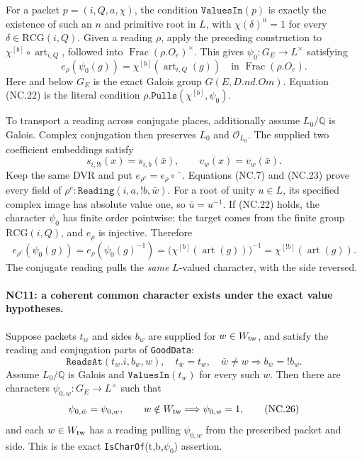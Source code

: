 For a packet \(p=(i,Q,a,\chi)\), the condition
\(\texttt{ValuesIn}(p)\) is exactly the existence of such an
\(n\) and primitive root in \(L\), with \(\chi(\delta)^n=1\)
for every \(\delta\in\mathrm{RCG}(i,Q)\).
Given a reading \(\rho\), apply the preceding construction
to
\(\chi^{[b]}\circ\operatorname{art}_{i,Q}\), followed into
\(\operatorname{Frac}(\rho.O_e)^\times\).
This gives \(\psi_0:G_E\to L^\times\) satisfying
\[
 e_\rho(\psi_0(g))
 =\chi^{[b]}(\operatorname{art}_{i,Q}(g))
 \quad\text{in }\operatorname{Frac}(\rho.O_e).
 \tag{NC.22}
\]
Here and below \(G_E\) is the exact Galois group \(G(E,D.nd.Om)\).
Equation (NC.22) is the literal condition
\(\rho.\texttt{Pulls}(\chi^{[b]},\psi_0)\).

To transport a reading across conjugate places, additionally
assume \(L_0/\mathbb Q\) is Galois. Complex conjugation then
preserves \(L_0\) and \(\mathcal O_{L_0}\).
The supplied two coefficient embeddings satisfy
\[
 s_{i,!b}(x)=s_{i,b}(\bar x),\qquad
 v_{\bar w}(x)=v_w(\bar x).
 \tag{NC.23}
\]
Keep the same DVR and put \(e_{\rho^c}=e_\rho\circ\bar{\phantom{x}}\).
Equations (NC.7) and (NC.23) prove every field of
\(\rho^c:\texttt{Reading}(i,a,!b,\bar w)\).
For a root of unity \(u\in L\), its specified complex image
has absolute value one, so \(\bar u=u^{-1}\).
If (NC.22) holds, the character \(\psi_0\) has finite order
pointwise: the target comes from the finite group
\(\mathrm{RCG}(i,Q)\), and \(e_\rho\) is injective.
Therefore
\[
 e_{\rho^c}(\psi_0(g))
 =e_\rho(\psi_0(g)^{-1})
 =\bigl(\chi^{[b]}(\operatorname{art}(g))\bigr)^{-1}
 =\chi^{[!b]}(\operatorname{art}(g)).
 \tag{NC.24}
\]
The conjugate reading pulls the \emph{same} \(L\)-valued
character, with the side reversed.

\paragraph{NC11: a coherent common character exists under the exact value hypotheses.}
Suppose packets \(t_w\) and sides \(b_w\) are supplied for
\(w\in W_{\rm tw}\), and satisfy the reading and conjugation
parts of \texttt{GoodData}:
\[
 \texttt{ReadsAt}(t_w.i,b_w,w),\quad
 t_{\bar w}=t_w,\quad
 \bar w\ne w\Longrightarrow b_{\bar w}=!b_w.
 \tag{NC.25}
\]
Assume \(L_0/\mathbb Q\) is Galois and
\(\texttt{ValuesIn}(t_w)\) for every such \(w\).
Then there are characters \(\psi_{0,w}:G_E\to L^\times\)
such that
\[
 \psi_{0,\bar w}=\psi_{0,w},\qquad
 w\notin W_{\rm tw}\Longrightarrow\psi_{0,w}=1,
 \tag{NC.26}
\]
and each \(w\in W_{\rm tw}\) has a reading pulling
\(\psi_{0,w}\) from the prescribed packet and side.
This is the exact \texttt{IsCharOf}(t,b,\(\psi_0\)) assertion.

